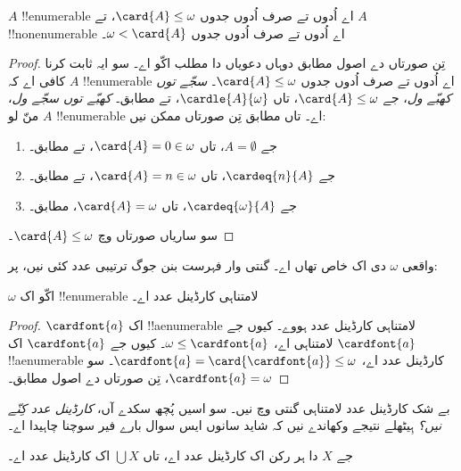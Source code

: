 \documentclass[../../../include/open-logic-section]{subfiles}
\begin{document}
\begin{prop}
$A$ !!{enumerable} اے اُدوں تے صرف اُدوں جدوں $\card{A} \leq \omega$، تے $A$ !!{nonenumerable} اے اُدوں تے صرف اُدوں جدوں $\omega < \card{A}$۔
\end{prop}

\begin{proof}
تِن صورتاں دے اصول مطابق دوہاں دعویاں دا مطلب اکّو اے۔ سو ایہ ثابت کرنا کافی اے کہ $A$ !!{enumerable} اے اُدوں تے صرف اُدوں جدوں $\card{A} \leq \omega$۔ \emph{سجّے توں کھبّے ول}، جے $\card{A} \leq \omega$، تاں $\cardle{A}{\omega}$،  تے  مطابق۔ \emph{کھبّے توں سجّے ول}، منّ لو $A$ !!{enumerable} اے۔ تاں  مطابق تِن صورتاں ممکن نیں:
\begin{enumerate}
	\item جے $A = \emptyset$، تاں $\card{A} = 0 \in \omega$،  تے  مطابق۔
	\item جے $\cardeq{n}{A}$، تاں $\card{A} = n \in \omega$،  تے  مطابق۔
	\item جے $\cardeq{\omega}{A}$، تاں $\card{A} = \omega$،  مطابق۔
\end{enumerate}
سو ساریاں صورتاں وچ $\card{A} \leq \omega$۔
\end{proof}
\noindent
واقعی $\omega$ دی اک خاص تھاں اے۔ گنتی وار فہرست بنن جوگ ترتیبی عدد کئی نیں، پر:

\begin{cor}
$\omega$ اکّو اک !!{enumerable} لامتناہی کارڈینل عدد اے۔
\end{cor}

\begin{proof}
$\cardfont{a}$ اک !!a{enumerable} لامتناہی کارڈینل عدد ہووے۔ کیوں جے $\cardfont{a}$ لامتناہی اے، $\omega \leq \cardfont{a}$۔ کیوں جے $\cardfont{a}$ اک !!a{enumerable} کارڈینل عدد اے، $\cardfont{a} =
\card{\cardfont{a}} \leq \omega$۔ سو $\cardfont{a} = \omega$، تِن صورتاں دے اصول مطابق۔ \end{proof}

بے شک کارڈینل عدد لامتناہی گنتی وچ نیں۔ سو اسیں پُچھ سکدے آں، \emph{کارڈینل عدد کِنّے نیں؟} ہِیٹھلے نتیجے وکھاندے نیں کہ شاید سانوں ایس سوال بارے فیر سوچنا چاہیدا اے۔

\begin{prop}
جے $X$ دا ہر رکن اک کارڈینل عدد اے، تاں $\bigcup X$ اک کارڈینل عدد اے۔
\end{prop}
\end{document}
